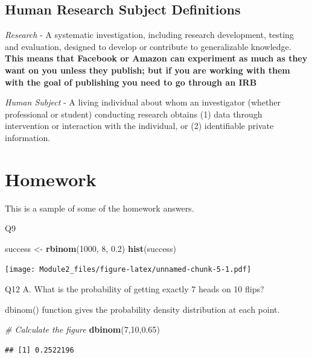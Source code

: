\documentclass[]{book}
\newenvironment{Shaded}{\begin{snugshade}}{\end{snugshade}}
\newcommand{\KeywordTok}[1]{\textcolor[rgb]{0.13,0.29,0.53}{\textbf{#1}}}
\newcommand{\DecValTok}[1]{\textcolor[rgb]{0.00,0.00,0.81}{#1}}
\newcommand{\FloatTok}[1]{\textcolor[rgb]{0.00,0.00,0.81}{#1}}
\newcommand{\StringTok}[1]{\textcolor[rgb]{0.31,0.60,0.02}{#1}}
\newcommand{\CommentTok}[1]{\textcolor[rgb]{0.56,0.35,0.01}{\textit{#1}}}
\newcommand{\NormalTok}[1]{#1}
\theoremstyle{definition}
\theoremstyle{definition}
\theoremstyle{definition}
\theoremstyle{remark}
\begin{document}
\subsection{Human Research Subject
Definitions}\label{human-research-subject-definitions}

\emph{Research} - A systematic investigation, including research
development, testing and evaluation, designed to develop or contribute
to generalizable knowledge. \textbf{This means that Facebook or Amazon
can experiment as much as they want on you unless they publish; but if
you are working with them with the goal of publishing you need to go
through an IRB}

\emph{Human Subject} - A living individual about whom an investigator
(whether professional or student) conducting research obtains (1) data
through intervention or interaction with the individual, or (2)
identifiable private information.

\section{Homework}\label{homework}

This is a sample of some of the homework answers.

Q9

\begin{Shaded}
\begin{Highlighting}[]
\NormalTok{success <-}\StringTok{ }\KeywordTok{rbinom}\NormalTok{(}\DecValTok{1000}\NormalTok{, }\DecValTok{8}\NormalTok{, }\FloatTok{0.2}\NormalTok{)}
\KeywordTok{hist}\NormalTok{(success)}
\end{Highlighting}
\end{Shaded}

\texttt{[image: Module2\_files/figure-latex/unnamed-chunk-5-1.pdf]}

Q12 A. What is the probability of getting exactly 7 heads on 10 flips?

dbinom() function gives the probability density distribution at each
point.

\begin{Shaded}
\begin{Highlighting}[]
\CommentTok{# Calculate the figure}
\KeywordTok{dbinom}\NormalTok{(}\DecValTok{7}\NormalTok{,}\DecValTok{10}\NormalTok{,}\FloatTok{0.65}\NormalTok{)}
\end{Highlighting}
\end{Shaded}

\begin{verbatim}
## [1] 0.2522196
\end{verbatim}
\end{document}
